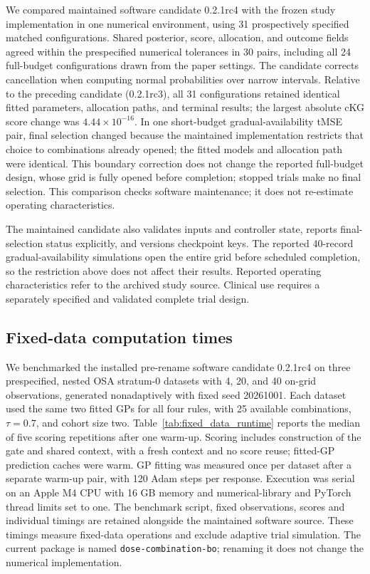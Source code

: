 \documentclass[11pt]{article}
\newcommand{\rev}[1]{{#1}}
\begin{document}
\rev{We compared maintained software candidate 0.2.1rc4 with the frozen study implementation in one numerical environment, using 31 prospectively specified matched configurations.} Shared posterior, score, allocation, and outcome fields agreed within the prespecified numerical tolerances in 30 pairs, including all 24 full-budget configurations drawn from the paper settings. \rev{The candidate corrects cancellation when computing normal probabilities over narrow intervals.} Relative to the preceding candidate (0.2.1rc3), all 31 configurations retained identical fitted parameters, allocation paths, and terminal results; the largest absolute cKG score change was $4.44\times10^{-16}$. In one short-budget gradual-availability tMSE pair, final selection changed because the maintained implementation restricts that choice to combinations already opened; the fitted models and allocation path were identical. This boundary correction does not change the reported full-budget design, whose grid is fully opened before completion; stopped trials make no final selection. \rev{This comparison checks software maintenance; it does not re-estimate operating characteristics.}

\rev{The maintained candidate also validates inputs and controller state, reports final-selection status explicitly, and versions checkpoint keys. The reported 40-record gradual-availability simulations open the entire grid before scheduled completion, so the restriction above does not affect their results. Reported operating characteristics refer to the archived study source. Clinical use requires a separately specified and validated complete trial design.}


\subsection{\rev{Fixed-data computation times}}\label{sec:runtime}

\rev{We benchmarked the installed pre-rename software candidate 0.2.1rc4 on three prespecified, nested OSA stratum-0 datasets with 4, 20, and 40 on-grid observations, generated nonadaptively with fixed seed 20261001. Each dataset used the same two fitted GPs for all four rules, with 25 available combinations, $\tau=0.7$, and cohort size two. Table~\ref{tab:fixed_data_runtime} reports the median of five scoring repetitions after one warm-up. Scoring includes construction of the gate and shared context, with a fresh context and no score reuse; fitted-GP prediction caches were warm. GP fitting was measured once per dataset after a separate warm-up pair, with 120 Adam steps per response. Execution was serial on an Apple M4 CPU with 16 GB memory and numerical-library and PyTorch thread limits set to one. The benchmark script, fixed observations, scores and individual timings are retained alongside the maintained software source. These timings measure fixed-data operations and exclude adaptive trial simulation. The current package is named \texttt{dose-combination-bo}; renaming it does not change the numerical implementation.}
\end{document}
